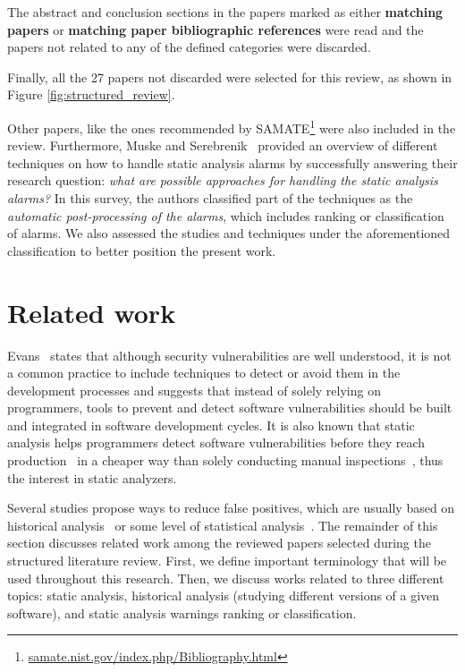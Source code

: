 The abstract and conclusion sections in the papers marked as either
\textbf{matching papers} or \textbf{matching paper bibliographic references} were read and the
papers not related to any of the defined categories were discarded.

Finally, all the 27 papers not discarded were selected for this review, as
shown in Figure \ref{fig:structured_review}. 

Other papers, like the ones recommended by
SAMATE\footnote{\url{samate.nist.gov/index.php/Bibliography.html}} were also
included in the review. Furthermore, Muske and
Serebrenik~\cite{muske2016survey} provided an overview of different techniques
on how to handle static analysis alarms by successfully answering their
research question: \textit{what are possible approaches for handling the static
analysis alarms?} In this survey, the authors classified part of the techniques
as the \textit{automatic post-processing of the alarms}, which includes ranking
or classification of alarms. We also assessed the studies and techniques under
the aforementioned classification to better position the present work.

\section{Related work}
\label{sec:related_work}

Evans~\cite{evans_improving_2002} states that although security vulnerabilities
are well understood, it is not a common practice to include techniques to detect
or avoid them in the development processes and suggests that instead of solely
relying on programmers, tools to prevent and detect software vulnerabilities
should be built and integrated in software development cycles. It is also
known that static analysis helps programmers detect software vulnerabilities
before they reach production~\cite{evans_improving_2002} in a cheaper way than
solely conducting manual inspections~\cite{johnson_why_2013}, thus the interest
in static analyzers.

Several studies propose ways to reduce false positives, which are usually based
on historical analysis~\cite{penta_evolution_2008, spacco_tracking_2006,
kim_which_2007} or some level of statistical analysis~\cite{muske2013review,
boogerd2006prioritizing, kremenek2003z, ruthruff_predicting_2008}. The
remainder of this section discusses related work among the reviewed papers
selected during the structured literature review. First, we define important terminology
that will be used throughout this research. Then, we discuss works related to
three different topics: static analysis, historical analysis (studying
different versions of a given software), and static analysis warnings ranking
or classification.


